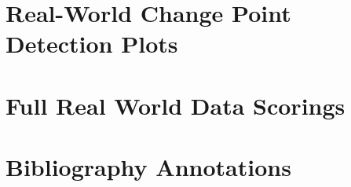 \documentclass{uvamscse}	%
\begin{document}
\chapter{Real-World Change Point Detection Plots}
\label{changeplots}




\chapter{Full Real World Data Scorings}
\label{fullscores}




\chapter{Bibliography Annotations}

\end{document}
